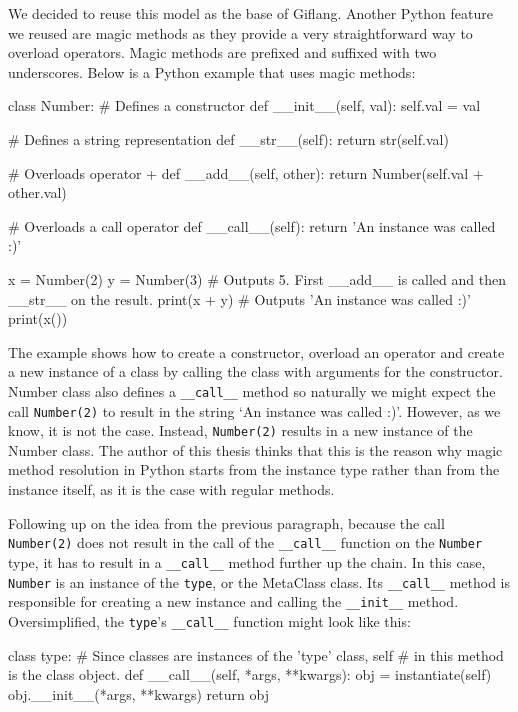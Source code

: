 We decided to reuse this model as the base of Giflang. Another Python feature we reused are magic methods as they provide a very straightforward way
to overload operators. Magic methods are prefixed and suffixed with two underscores. Below is a Python example that uses magic methods:
\begin{code}
class Number:
    # Defines a constructor
    def __init__(self, val):
        self.val = val
    
    # Defines a string representation
    def __str__(self):
        return str(self.val)

    # Overloads operator +
    def __add__(self, other):
        return Number(self.val + other.val)

    # Overloads a call operator
    def __call__(self):
        return 'An instance was called :)'

x = Number(2)
y = Number(3)
# Outputs 5. First __add__ is called and then __str__ on the result.
print(x + y)
# Outputs 'An instance was called :)'
print(x())
\end{code}

The example shows how to create a constructor, overload an operator and create a new instance of a class by calling the class with arguments for the constructor.
Number class also defines a \texttt{\_\_call\_\_} method so naturally we might expect the call \texttt{Number(2)} to result in the string `An instance was called :)'. However,
as we know, it is not the case. Instead, \texttt{Number(2)} results in a new instance of the Number class. The author of this thesis thinks that this is
the reason why magic method resolution in Python starts from the instance type rather than from the instance itself, as it is the case with regular methods.

Following up on the idea from the previous paragraph, because the call \texttt{Number(2)} does not result in the call of the \texttt{\_\_call\_\_} function on the
\texttt{Number} type, it has to result in a \texttt{\_\_call\_\_} method further up the chain. In this case, \texttt{Number} is an instance of the \texttt{type},
or the MetaClass class. Its \texttt{\_\_call\_\_} method is responsible for creating a new instance and calling the \texttt{\_\_init\_\_} method. Oversimplified,
the \texttt{type}'s \texttt{\_\_call\_\_} function might look like this:
\begin{code}
class type:
    # Since classes are instances of the 'type' class, self
    # in this method is the class object. 
    def __call__(self, *args, **kwargs):
        obj = instantiate(self)
        obj.__init__(*args, **kwargs)
        return obj
\end{code}

